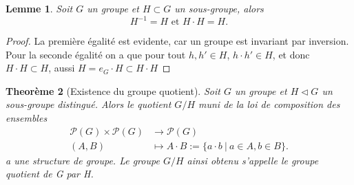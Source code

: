 \documentclass[french]{article}
\theoremstyle{plain}
\newtheorem{thm}{Theorème}[section]
\newtheorem{lem}[thm]{Lemme}
\theoremstyle{remark}
\theoremstyle{definition}
\begin{document}
\begin{lem}
	\label{hh-h}
	Soit $G$ un groupe et $H \subset G$ un sous-groupe, alors
	\begin{equation*}
		H^{-1} = H \textrm{ et } H \cdot H = H.
	\end{equation*}
\end{lem}
\begin{proof}
	La première égalité est evidente, car un groupe est invariant par inversion. Pour la seconde égalité on a que pour tout $h, h' \in H$, $h \cdot h' \in H$, et donc $H \cdot H \subset H$, aussi $H = {e_G} \cdot H \subset H \cdot H$
\end{proof}


\begin{thm}[Existence du groupe quotient]
	\label{existence-quotient}
	Soit $G$ un groupe et $H \triangleleft G$ un sous-groupe distingué.
	Alors le quotient $G/H$ muni de la loi de composition des ensembles
	\begin{align*}
		\mathcal{P}(G) \times \mathcal{P}(G) &\to \mathcal{P}(G)\\
		(A, B) &\mapsto A \cdot B := \{a \cdot b\ |\ a \in A, b \in B\}.
	\end{align*}
	a une structure de groupe. Le groupe $G/H$ ainsi obtenu s'appelle le groupe quotient de G par H.
\end{thm}
\end{document}
